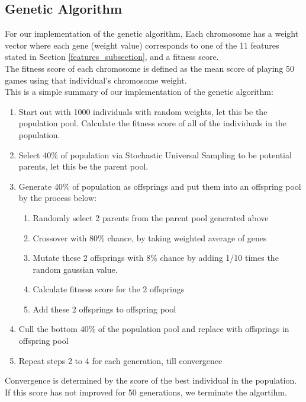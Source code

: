 \documentclass[a4paper,12pt,twocolumn]{article}
\begin{document}
\subsection{Genetic Algorithm}
For our implementation of the genetic algorithm, Each chromosome has a weight
vector where each gene (weight value) corresponds to one of the 11 features
stated in Section \ref{features_subsection}, and a fitness score.\\


The fitness score of each chromosome is defined as the mean score of playing 50
games using that individual's chromosome weight.\\

This is a simple summary of our implementation of the genetic algorithm:
\begin{enumerate}
    \item Start out with 1000 individuals with random weights, let this be the population pool.
    Calculate the fitness score of all of the individuals in the population.
    \item Select 40\% of population via Stochastic Universal Sampling to be
            potential parents, let this be the parent pool.
    \item Generate 40\% of population as offsprings and put them into an offspring pool
    by the process below:
        \begin{enumerate}
            \item Randomly select 2 parents from the parent pool generated above
            \item Crossover with 80\% chance, by taking weighted average of genes
            \item Mutate these 2 offsprings with 8\% chance by adding 1/10 times
                the random gaussian value.
            \item Calculate fitness score for the 2 offsprings
            \item Add these 2 offsprings to offspring pool
        \end{enumerate}
    \item Cull the bottom 40\% of the population pool and replace with offsprings
    in offspring pool
    \item Repeat steps 2 to 4 for each generation, till convergence
\end{enumerate}

Convergence is determined by the score of the best individual in the population.
If this score has not improved for 50 generations, we terminate the algortihm.
\end{document}
